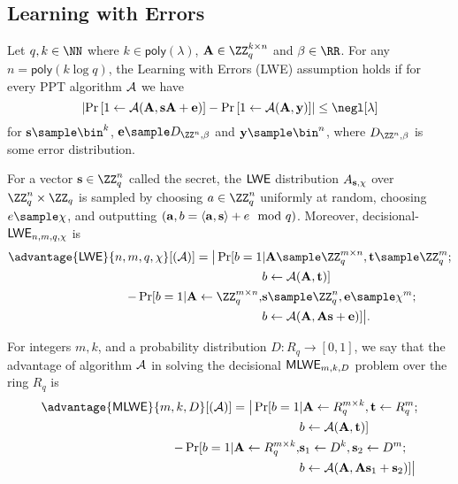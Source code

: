 \subsection{Learning with Errors}
\begin{definition}
\label{assum:lwe}
Let $q,k\in \NN$ where $k\in\mathsf{poly}(\lambda)$, $\An\in\ZZ_q^{k\times n}$ and $\beta\in\RR$. For any $ n=\mathsf{poly}(k\log q)$, the Learning with Errors (LWE) assumption holds if for every PPT algorithm $\mathcal{A}$ we have $$\left |\Pr\left [1\leftarrow \Ac(\An,\sn\An+\en) \right ] -\Pr\left [1\leftarrow \Ac(\An,\yn) \right ]\right  |\leq \negl[\lambda]$$ for $\sn\sample \bin^k$, $\en\sample D_{\ZZ^n,\beta}$ and $\yn\sample \bin^n$, where $D_{\ZZ^n,\beta}$ is some error distribution.
\end{definition}


\begin{definition}
For a vector $\sn\in\ZZ^n_q$ called the secret, the $\mathsf{LWE}$ distribution $A_{\mathbf{s},\chi}$ over $\ZZ^n_q\times\ZZ_q$ is sampled by choosing $a\in\ZZ_q^n$ uniformly at random, choosing $e\sample\chi$, and outputting $(\mathbf{a},b=\langle\mathbf{a},\mathbf{s}\rangle+e\mod q)$. Moreover, decisional-$\mathsf{LWE}_{n,m,q,\chi}$ is
\begin{align*}
    \advantage{\lwe}{n,m,q,\chi}[(\Ac)] = \big|    \Pr[b=1 & |\An\sample\ZZ^{m\times n}_q,\tn\sample \ZZ^m_q;\\ &b\gets\Ac(\An,\tn)] \\
    -\Pr[b=1 | \An\gets \ZZ^{m\times n}_q, &
    \sn\sample\ZZ_q^n,\en\sample \chi^m;\\ &b\gets\Ac(\An,\An\sn+\en)]\big|.
\end{align*}
\end{definition}

\begin{definition}
For integers $m, k$, and a probability distribution $D: R_q \to [0, 1]$,
we say that the advantage of algorithm $\mathcal{A}$ in solving the decisional $\mathsf{MLWE}_{m,k,D}$ problem
over the ring $R_q$ is
\begin{align*}
    \advantage{\mlwe}{m,k,D}[(\Ac)] = \big| \Pr[b=1 &|\An\gets R^{m\times k}_q,\tn\gets R^m_q; \\
    &b\gets\Ac(\An,\tn)] \\
    -\Pr[b=1 | \An\gets R^{m\times k}_q, & \sn_1\gets D^k,\sn_2\gets D^m;\\
    &b\gets\Ac(\An,\An\sn_1+\sn_2)]\big|
\end{align*}
\end{definition}

